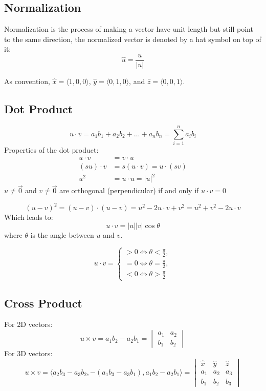\documentclass[12pt]{report}
\begin{document}
\subsection{Normalization}
Normalization is the process of making a vector have unit length but still point to the same direction, the normalized vector is denoted by a hat symbol on top of it:
$$
\hat{u} = \frac{u}{|u|}
$$

As convention, $\hat{x} = \langle 1, 0, 0 \rangle$, $\hat{y} = \langle 0, 1, 0 \rangle$, and $\hat{z} = \langle 0, 0, 1 \rangle$.

\subsection{Dot Product}
$$
u \cdot v = a_1b_1 + a_2b_2 + \dots + a_nb_n = \sum_{i=1}^{n}a_ib_i
$$
Properties of the dot product:
\begin{align*}
u \cdot v &= v \cdot u\\
(su) \cdot v &= s(u \cdot v) = u\cdot (sv) \\
u^2 &= u \cdot u = |u|^2
\end{align*}
$u \neq \vec{0}$ and $v \neq \vec{0} $ are orthogonal (perpendicular) if and only if $u \cdot v = 0$

$$
(u - v)^2 = (u - v)\cdot(u - v) = u^2 -2u\cdot v + v^2 = u^2 + v^2 -2u\cdot v
$$
Which leads to:
$$
u \cdot v = |u||v|\cos\theta
$$
where $\theta$ is the angle between $u$ and $v$.

$$
u \cdot v = \begin{cases}
> 0 \Leftrightarrow \theta < \frac{\pi}{2},\\
= 0 \Leftrightarrow \theta = \frac{\pi}{2}, \\
< 0 \Leftrightarrow \theta > \frac{\pi}{2}
\end{cases}
$$

\subsection{Cross Product}
For 2D vectors:
$$
u \times v = a_1b_2 - a_2b_1 = \begin{vmatrix}a_1 & a_2 \\ b_1 & b_2 \end{vmatrix}
$$
For 3D vectors:
$$
u \times v = \langle a_2b_3 - a_3b_2, -(a_1b_3 - a_3b_1), a_1b_2 - a_2b_1\rangle = \begin{vmatrix}\hat{x} & \hat{y} & \hat{z} \\ a_1 & a_2 & a_3 \\ b_1 & b_2 & b_3\end{vmatrix}
$$
\end{document}
